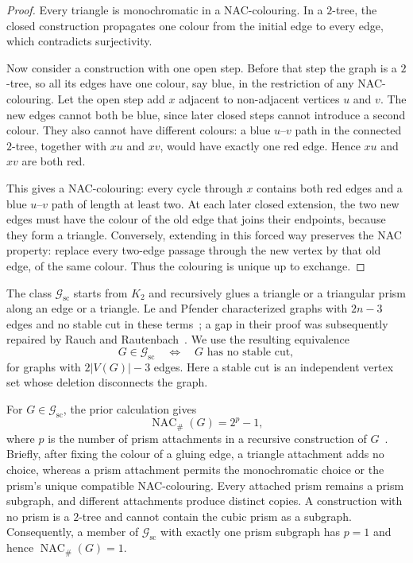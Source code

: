 \documentclass[11pt]{amsart}
\theoremstyle{definition}
\newcommand{\NACnum}{\operatorname{NAC}_{\#}}
\newcommand{\Gsc}{\mathcal G_{\mathrm{sc}}}
\begin{document}
\begin{proof}
Every triangle is monochromatic in a NAC-colouring.  In a $2$-tree, the closed
construction propagates one colour from the initial edge to every edge, which
contradicts surjectivity.

Now consider a construction with one open step.  Before that step the graph is
a $2$-tree, so all its edges have one colour, say blue, in the restriction of
any NAC-colouring.  Let the open step add $x$ adjacent to non-adjacent vertices
$u$ and $v$.  The new edges cannot both be blue, since later closed steps
cannot introduce a second colour.  They also cannot have different colours:
a blue $u$--$v$ path in the connected $2$-tree, together with $xu$ and $xv$,
would have exactly one red edge.  Hence $xu$ and $xv$ are both red.

This gives a NAC-colouring: every cycle through $x$ contains both red edges
and a blue $u$--$v$ path of length at least two.  At each later closed
extension, the two new edges must have the colour of the old edge that joins
their endpoints, because they form a triangle.  Conversely, extending in this
forced way preserves the NAC property: replace every two-edge passage through
the new vertex by that old edge, of the same colour.  Thus the colouring is
unique up to exchange.
\end{proof}

The class $\Gsc$ starts from $K_2$ and recursively glues a triangle or a
triangular prism along an edge or a triangle.  Le and Pfender characterized
graphs with $2n-3$ edges and no stable cut in these terms~\cite{lepfender2013};
a gap in their proof was subsequently repaired by Rauch and
Rautenbach~\cite{rauch2025}.  We use the resulting equivalence
\begin{equation}\label{eq:gsc}
  G\in\Gsc
  \quad\Longleftrightarrow\quad
  G\text{ has no stable cut},
\end{equation}
for graphs with $2|V(G)|-3$ edges.  Here a stable cut is an independent vertex
set whose deletion disconnects the graph.

For $G\in\Gsc$, the prior calculation gives
\begin{equation}\label{eq:family-a}
 \NACnum(G)=2^p-1,
\end{equation}
where $p$ is the number of prism attachments in a recursive construction of
$G$~\cite[following Conjecture~6.1]{clinch2026}.  Briefly, after fixing the
colour of a gluing edge, a triangle attachment adds no choice, whereas a prism
attachment permits the monochromatic choice or the prism's unique compatible
NAC-colouring.  Every attached prism remains a prism subgraph, and different
attachments produce distinct copies.  A construction with no prism is a
$2$-tree and cannot contain the cubic prism as a subgraph.  Consequently, a
member of $\Gsc$ with exactly one prism subgraph has $p=1$ and hence
$\NACnum(G)=1$.
\end{document}
